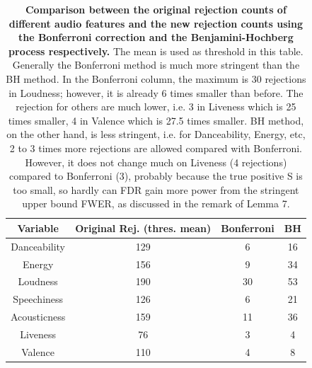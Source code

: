 \documentclass[12pt]{article}
\theoremstyle{plain}
\theoremstyle{definition}
\theoremstyle{remark}
\begin{document}
\begin{table}[h!]
    \centering
    \begin{tabular}{|c|c|c|c|}
       \hline
       Variable & Original Rej. (thres. mean) & Bonferroni & BH \\
       \hline
        Danceability &129 &6&16\\
        \hline
        Energy &156 &9&34\\
        \hline
        Loudness &190 &30&53\\
        \hline
        Speechiness &126 &6&21\\
        \hline
        Acousticness &159 &11&36\\
        \hline
        Liveness & 76&3&4\\
        \hline
        Valence & 110&4&8\\
        \hline
    \end{tabular}
    \caption{\textbf{Comparison between the original rejection counts of different audio features and the new rejection counts using the Bonferroni correction and the Benjamini-Hochberg process respectively.} The mean is used as threshold in this table. Generally the Bonferroni method is much more stringent than the BH method. In the Bonferroni column, the maximum is 30 rejections in Loudness; however, it is already 6 times smaller than before. The rejection for others are much lower, i.e. 3 in Liveness which is 25 times smaller, 4 in Valence which is 27.5 times smaller. BH method, on the other hand, is less stringent, i.e. for Danceability, Energy, etc, 2 to 3 times more rejections are allowed compared with Bonferroni. However, it does not change much on Liveness (4 rejections) compared to Bonferroni (3), probably because the true positive S is too small, so hardly can FDR gain more power from the stringent upper bound FWER, as discussed in the remark of Lemma 7. }
    \label{table 5}
\end{table}
\end{document}

